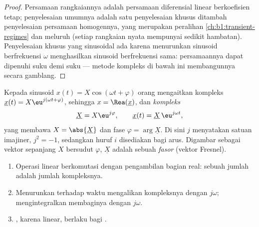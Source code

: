 \begin{proof}
Persamaan rangkaiannya adalah persamaan diferensial linear berkoefisien
tetap; penyelesaian umumnya adalah satu penyelesaian khusus ditambah
penyelesaian persamaan homogennya, yang merupakan peralihan
\cref{ch:b1:transient-regimes} dan meluruh (setiap rangkaian nyata
mempunyai sedikit hambatan). Penyelesaian khusus yang sinusoidal ada
karena menurunkan sinusoid berfrekuensi $\omega$ menghasilkan sinusoid
berfrekuensi sama: persamaannya dapat dipenuhi suku demi suku ---
metode kompleks di bawah ini membangunnya secara gamblang.
\end{proof}

\begin{definition}\label{def:b1:sinusoidal-impedance:complex}
Kepada sinusoid $x(t) = X\cos(\omega t + \varphi)$ orang mengaitkan
 kompleks $\underline{x}(t) = X\eu^{j(\omega t + \varphi)}$, sehingga
$x = \Rea(\underline{x})$, dan \emph{ kompleks}
\[
\underline{X} = X\eu^{j\varphi}, \qquad \underline{x}(t) = \underline{X}\,\eu^{j\omega t},
\]
yang membawa  $X = \abs{\underline{X}}$ dan fase
$\varphi = \arg\underline{X}$. Di sini $j$ menyatakan satuan imajiner,
$j^2 = -1$, sedangkan huruf $i$ disediakan bagi arus. Digambar sebagai
vektor sepanjang $X$ bersudut $\varphi$, $\underline{X}$ adalah sebuah
\emph{fasor} (vektor Fresnel).
\end{definition}

\begin{proposition}\label{prop:b1:sinusoidal-impedance:rules}
\begin{enumerate}
  \item Operasi linear berkomutasi dengan pengambilan bagian real:
         sebuah jumlah adalah jumlah 
        kompleksnya.
  \item Menurunkan terhadap waktu mengalikan  kompleksnya
        dengan $j\omega$; mengintegralkan membaginya dengan $j\omega$.
  \item {}, karena linear, berlaku bagi .
\end{enumerate}
\end{proposition}

